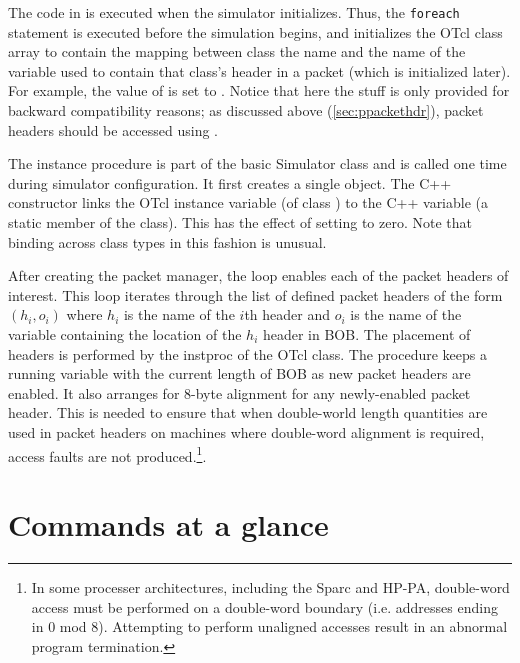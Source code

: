 The code in  is executed
when the simulator initializes.
Thus, the {\tt foreach} statement is executed before the
simulation begins, and initializes the OTcl class array
 to contain the mapping between class
the name and the name of the variable used to contain
that class's header in a packet (which is initialized later).
For example, the value of  is set to
.
Notice that here the  stuff is only provided
for backward compatibility reasons;
as discussed above (\ref{sec:ppackethdr}), packet headers should
be accessed using . 

The  instance procedure is part of the
basic Simulator class and is called one time during simulator
configuration.
It first creates a single  object.
The C++ constructor links the OTcl instance
variable  (of class )
to the C++ variable  (a static
member of the  class).
This has the effect of setting  to
zero.
Note that binding across class types in this fashion is
unusual.

\label{sec:configpacket}
After creating the packet manager, the 
loop enables each of the packet headers of interest.
This loop iterates through the list of defined
packet headers of the form
$(h_i, o_i)$ where $h_i$ is the name of the  $i$th header
and $o_i$ is the name of the variable containing the
location of the $h_i$ header in BOB.
The placement of headers is performed by the 
instproc of the  OTcl class.
The procedure keeps a running variable  with
the current length of BOB as new packet headers are enabled.
It also arranges for 8-byte alignment for any newly-enabled packet
header.
This is needed to ensure that when double-world length quantities
are used in packet headers on machines where double-word alignment
is required, access faults are not produced.\footnote{In
some processer architectures, including the
Sparc and HP-PA, double-word access must be performed on a double-word
boundary (i.e. addresses ending in 0 mod 8).  Attempting to perform
unaligned accesses result in an abnormal program termination.}.


\section{Commands at a glance}
\label{sec:pktcommand}

